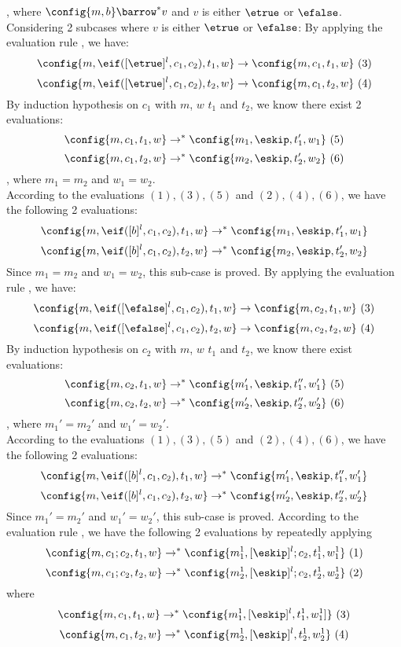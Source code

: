 {\begin{subproof}
\[\]
%
, where $\config{m, b} \barrow^{*} v$ and $v$ is either $\etrue$ or $\efalse$.
\\
Considering 2 subcases where $v$ is either $\etrue$ or $\efalse$:
%
%
By applying the evaluation rule , we have:
\[
\config{m, \eif([\etrue]^l, c_1, c_2), t_1, w} \to \config{m, c_1, t_1, w} ~ (3)
\]
%
\[
\config{m, \eif([\etrue]^l, c_1, c_2), t_2, w} \to \config{m, c_1, t_2, w} ~ (4)
\]
%
By induction hypothesis on $c_1$ with $m$, $w$ $t_1$ and $t_2$, we know there exist 2 evaluations:
\[
	\config{m, c_1, t_1, w} \to^{*} \config{m_1, \eskip, t_1', w_1} ~ (5)
\]
%
\[
	\config{m, c_1, t_2, w} \to^{*} \config{m_2, \eskip, t_2', w_2} ~ (6)
\]
%
, where $m_1 = m_2$ and $w_1 = w_2$.
\\
According to the evaluations $(1), (3), (5)$ and $(2), (4), (6)$, we have the following 2 evaluations:
% 
\[
	\config{m, \eif([b]^l, c_1, c_2), t_1, w} \to^{*} \config{m_1, \eskip, t_1', w_1}
\]
%
\[
	\config{m, \eif([b]^l, c_1, c_2), t_2, w} \to^{*} \config{m_2, \eskip, t_2', w_2}
\]
%
Since $m_1 = m_2$ and $w_1 = w_2$, this sub-case is proved.
%
%
By applying the evaluation rule , we have:
%
\[
\config{m, \eif([\efalse]^l, c_1, c_2), t_1, w} \to \config{m, c_2, t_1, w} ~ (3)
\]
%
\[
\config{m, \eif([\efalse]^l, c_1, c_2), t_2, w} \to \config{m, c_2, t_2, w} ~ (4)
\]
%
By induction hypothesis on $c_2$ with $m$, $w$ $t_1$ and $t_2$, we know there exist evaluations:
\[
	\config{m, c_2, t_1, w} \to^{*} \config{m_1', \eskip, t_1'', w_1'} ~ (5)
\]
%
\[
	\config{m, c_2, t_2, w} \to^{*} \config{m_2', \eskip, t_2'', w_2'} ~ (6)
\]
%
, where $m_1' = m_2'$ and $w_1' = w_2'$.
\\
According to the evaluations $(1), (3), (5)$ and $(2), (4), (6)$, we have the following 2 evaluations:
% 
\[
	\config{m, \eif([b]^l, c_1, c_2), t_1, w} \to^{*} \config{m_1', \eskip, t_1'', w_1'}
\]
%
\[
	\config{m, \eif([b]^l, c_1, c_2), t_2, w} \to^{*} \config{m_2', \eskip, t_2'', w_2'}
\]
%
Since $m_1' = m_2'$ and $w_1' = w_2'$, this sub-case is proved.
%
%
According to the evaluation rule , we have the following 2 evaluations by repeatedly applying  
%
\[
\config{m, c_1;c_2, t_1, w} \to^{*} \config{m_1^1, [\eskip]^l;c_2,  t_1^1, w_1^1} ~ (1)
\]
%
%
\[
\config{m, c_1;c_2, t_2, w} \to^{*} \config{m_2^1, [\eskip]^l;c_2,  t_2^1, w_2^1} ~ (2)
\]
%
where 
%
\[
	\config{m, c_1, t_1, w} \to^{*} \config{m_1^1, [\eskip]^l, t_1^1, w_1^1]} ~ (3)
\]
%
%
\[
\config{m, c_1, t_2, w} \to^{*} \config{m_2^1, [\eskip]^l,  t_2^1, w_2^1} ~ (4)
\]
\end{subproof}}
